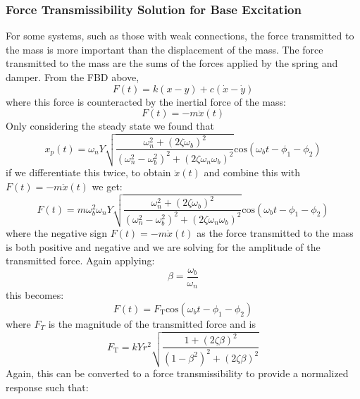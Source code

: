 \documentclass[12pt,letter]{article}
\numberwithin{ex}{section} %
\numberwithin{re}{section} %
\begin{document}
			\subsubsection{Force Transmissibility Solution for Base Excitation}
			
				For some systems, such as those with weak connections, the force transmitted to the mass is more important than the displacement of the mass. The force transmitted to the mass are the sums of the forces applied by the spring and damper. From the FBD above,
				\begin{equation}
				F(t) = k(x-y) + c(\dot{x} - \dot{y}) 
				\end{equation}
				where this force is counteracted by the inertial force of the mass:
				\begin{equation}
				F(t) = -m\ddot{x}(t)
				\end{equation}
				Only considering the steady state we found that 
				\begin{equation}
					x_p(t) = 	\omega_n Y   \sqrt{\frac{\omega_n^2 + (2 \zeta \omega_b)^2 }{(\omega_n^2 - \omega_b^2)^2 +  (2\zeta \omega_n \omega_b)^2} }  \text{cos}(\omega_bt - \phi_1 - \phi_2)
				\end{equation} 
				if we differentiate this twice, to obtain $\ddot{x}(t)$ and combine this with $F(t) = -m\ddot{x}(t)$ we get:
				\begin{equation}
					F(t) = 	m \omega_b^2 \omega_n Y   \sqrt{\frac{\omega_n^2 + (2 \zeta \omega_b)^2 }{(\omega_n^2 - \omega_b^2)^2 +  (2\zeta \omega_n \omega_b)^2} }  \text{cos}(\omega_bt - \phi_1 - \phi_2)
				\end{equation} 
				where the negative sign $F(t) = -m\ddot{x}(t)$ as the force transmitted to the mass is both positive and negative and we are solving for the amplitude of the transmitted force. Again applying:
				\begin{equation}
					\beta=\frac{\omega_b}{\omega_n}
				\end{equation} 
				this becomes:
				\begin{equation}
					F(t) = 	F_\text{T} \text{cos}(\omega_bt - \phi_1 - \phi_2)
				\end{equation} 
				where $F_T$ is the magnitude of the transmitted force and is 
				\begin{equation}
					F_\text{T} = kYr^2 \sqrt{\frac{1+(2 \zeta \beta)^2}{(1-\beta^2)^2 + (2 \zeta \beta )^2}} 
				\end{equation}
				Again, this can be converted to a force transmissibility to provide a normalized response such that:
\end{document}

